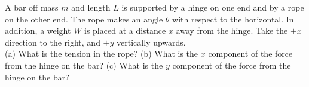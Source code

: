 A bar off mass $m$ and length $L$ is supported by a hinge on one end
and by a rope on the other end. The rope makes an angle $\theta$ with
respect to the horizontal. In addition, a weight $W$ is placed at a
distance $x$ away from the hinge. Take the $+x$ direction to the
right, and $+y$ vertically upwards.\\
%
(a) What is the tension in the rope?\answercheck\hwendpart
%
(b) What is the $x$ component of the force from the hinge on the
bar?\answercheck\hwendpart
%
(c) What is the $y$ component of the force from the hinge on the bar?\answercheck

